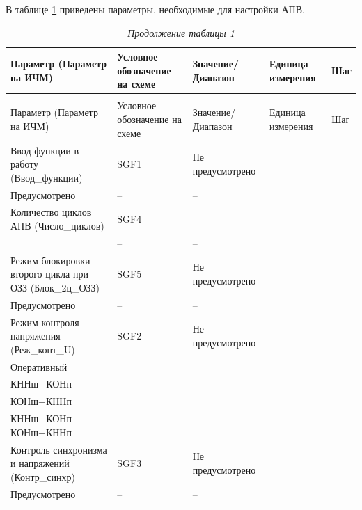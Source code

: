 \par
В таблице \ref{apv:tbl1} приведены параметры, необходимые для настройки АПВ.

\footnotesize
\begin{longtable}{|>{\centering\arraybackslash}m{5.3cm}|>{\centering\arraybackslash}m{3.3cm}|>{\centering\arraybackslash}m{4.2cm}|>{\centering\arraybackslash}m{1.8cm}|>{\centering\arraybackslash}m{1cm}|}
\caption{Параметры для настройки АПВ\hfill\vspace{-0.5\baselineskip}}\label{apv:tbl1}\\ 
\hline
\rowcolor{gray!20}
Параметр (Параметр на ИЧМ) & Условное обозначение на схеме & Значение/ Диапазон & Единица измерения & Шаг \\ 
\hline
\endfirsthead
\caption*{\hspace{3pt}\emph{Продолжение таблицы \ref{apv:tbl1}\hfill\vspace{-0.5\baselineskip}}} \\ %
\hline
\rowcolor{gray!20}
Параметр (Параметр на ИЧМ) & Условное обозначение на схеме & Значение/ Диапазон & Единица измерения & Шаг \\ 
\endhead
\endfoot
\endlastfoot
\centering Ввод функции в работу (Ввод\_функции)  & \centering SGF1 & \centering Не предусмотрено \\ Предусмотрено & \centering -- & \centering \arraybackslash -- \\
\hline
\centering Количество циклов АПВ (Число\_циклов)  & \centering SGF4 & \centering 1 \\ 2 & \centering -- & \centering \arraybackslash -- \\
\hline
\centering Режим блокировки второго цикла при ОЗЗ (Блок\_2ц\_ОЗЗ)  & \centering SGF5 & \centering Не предусмотрено \\ Предусмотрено & \centering -- & \centering \arraybackslash -- \\
\hline
\centering Режим контроля напряжения (Реж\_конт\_U)  & \centering SGF2 & \centering Не предусмотрено \\ Оперативный \\ КННш+КОНп \\ КОНш+КННп \\ КННш+КОНп-КОНш+КННп & \centering -- & \centering \arraybackslash -- \\
\hline
\centering Контроль синхронизма и напряжений (Контр\_синхр)  & \centering SGF3 & \centering Не предусмотрено \\ Предусмотрено & \centering -- & \centering \arraybackslash -- \\

\end{longtable}
